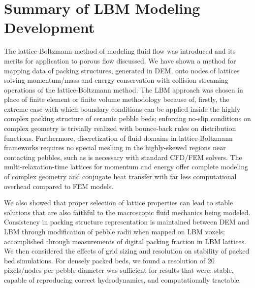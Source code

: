 \section{Summary of LBM Modeling Development}
The lattice-Boltzmann method of modeling fluid flow was introduced and its merits for application to porous flow discussed. We have shown a method for mapping data of packing structures, generated in DEM, onto nodes of lattices solving momentum/mass and energy conservation with collision-streaming operations of the lattice-Boltzmann method. The LBM approach was chosen in place of finite element or finite volume methodology because of, firstly, the extreme ease with which boundary conditions can be applied inside the highly complex packing structure of ceramic pebble beds; enforcing no-slip conditions on complex geometry is trivially realized with bounce-back rules on distribution functions. Furthermore, discretization of fluid domains in lattice-Boltzmann frameworks requires no special meshing in the highly-skewed regions near contacting pebbles, such as is necessary with standard CFD/FEM solvers. The multi-relaxation-time lattices for momentum and energy offer complete modeling of complex geometry and conjugate heat transfer with far less computational overhead compared to FEM models.

We also showed that proper selection of lattice properties can lead to stable solutions that are also faithful to the macroscopic fluid mechanics being modeled. Consistency in packing structure representation is maintained between DEM and LBM through modification of pebble radii when mapped on LBM voxels; accomplished through measurements of digital packing fraction in LBM lattices. We then considered the effects of grid sizing and resolution on stability of packed bed simulations. For densely packed beds, we found a resolution of 20 pixels/nodes per pebble diameter was sufficient for results that were: stable, capable of reproducing correct hydrodynamics, and computationally tractable.